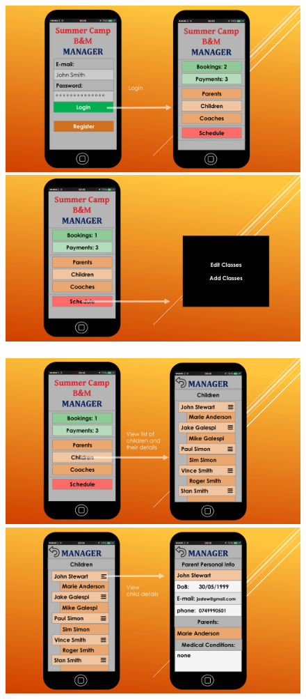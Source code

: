\documentclass{l3proj}
\begin{document}
{
\begin{figure}[h]
\includegraphics[scale=0.20]{page-3.jpg}
\includegraphics[scale=0.20]{page-17.jpg}
\\
\\
\includegraphics[scale=0.20]{page-13.jpg}
\includegraphics[scale=0.20]{page-14.jpg}

\end{figure}}
\end{document}
